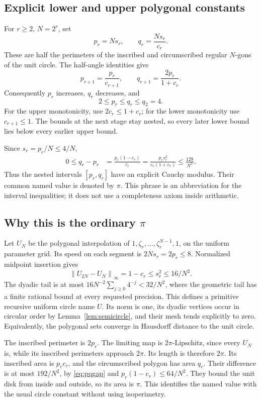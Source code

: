 \documentclass[11pt,a4paper]{article}
\theoremstyle{definition}
\newcommand{\norm}[1]{\left\|#1\right\|}
\begin{document}
\subsection{Explicit lower and upper polygonal constants}
For \(r\ge2\), \(N=2^r\), set
\[
 p_r=Ns_r,\qquad q_r=\frac{Ns_r}{c_r}.
 \tag{3.5}\label{eq:pq}
\]
These are half the perimeters of the inscribed and circumscribed
regular \(N\)-gons of the unit circle. The half-angle identities give
\[
 p_{r+1}=\frac{p_r}{c_{r+1}},\qquad
 q_{r+1}=\frac{2p_r}{1+c_r}.
 \tag{3.6}\label{eq:pqrec}
\]
Consequently \(p_r\) increases, \(q_r\) decreases, and
\[
 2\le p_r\le q_r\le q_2=4.
 \tag{3.7}\label{eq:pqbound}
\]
For the upper monotonicity, use
\(2c_r\le1+c_r\); for the lower monotonicity use \(c_{r+1}\le1\).
The bounds at the next stage stay nested, so every later lower bound
lies below every earlier upper bound.

Since \(s_r=p_r/N\le4/N\),
\[
 \begin{split}
 0\le q_r-p_r
 &=\frac{p_r(1-c_r)}{c_r}
  =\frac{p_rs_r^2}{c_r(1+c_r)}
 \le \frac{128}{N^2}.
 \end{split}
 \tag{3.8}\label{eq:pqgap}
\]
Thus the nested intervals \([p_r,q_r]\) have an explicit Cauchy
modulus. Their common named value is denoted by \(\pi\).
This phrase is an abbreviation for the interval inequalities; it does
not use a completeness axiom inside arithmetic.

\subsection{Why this is the ordinary \texorpdfstring{\(\pi\)}{pi}}
Let \(U_N\) be the polygonal interpolation of
\(1,\zeta_r,\ldots,\zeta_r^{N-1},1\), on the uniform parameter grid.
Its speed on each segment is \(2Ns_r=2p_r\le8\).
Normalized midpoint insertion gives
\[
 \norm{U_{2N}-U_N}_\infty=1-c_r
 \le s_r^2\le16/N^2.
 \tag{3.9}\label{eq:circlemesh}
\]
The dyadic tail is at most
\(16N^{-2}\sum_{j\ge0}4^{-j}<32/N^2\), where the geometric
tail has a finite rational bound at every requested precision.
This defines a primitive recursive uniform circle name \(U\).
Its norm is one, its dyadic vertices occur in circular order by
Lemma~\ref{lem:semicircle}, and their mesh tends explicitly to zero.
Equivalently, the polygonal sets converge in Hausdorff distance to
the unit circle.

The inscribed perimeter is \(2p_r\). The limiting map is
\(2\pi\)-Lipschitz, since every \(U_N\) is, while its inscribed
perimeters approach \(2\pi\). Its length is therefore \(2\pi\).
Its inscribed area is \(p_rc_r\), and the circumscribed polygon
has area \(q_r\). Their difference is at most \(192/N^2\),
by \eqref{eq:pqgap} and \(p_r(1-c_r)\le64/N^2\).
They bound the unit disk from inside and outside, so its area is
\(\pi\). This identifies the named value with the usual circle constant
without using isoperimetry.
\end{document}
